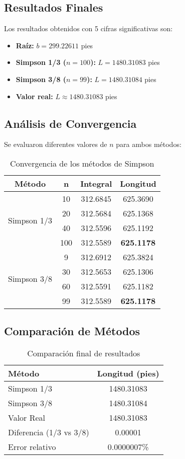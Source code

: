 \documentclass[conference]{IEEEtran}
\begin{document}
\subsection{Resultados Finales}

Los resultados obtenidos con 5 cifras significativas son:

\begin{itemize}
    \item \textbf{Raíz:} $b = 299.22611$ pies
    \item \textbf{Simpson 1/3 ($n=100$):} $L = 1480.31083$ pies
    \item \textbf{Simpson 3/8 ($n=99$):} $L = 1480.31084$ pies
    \item \textbf{Valor real:} $L \approx 1480.31083$ pies
\end{itemize}

\subsection{Análisis de Convergencia}

Se evaluaron diferentes valores de $n$ para ambos métodos:

\begin{table}[H]
\centering
\caption{Convergencia de los métodos de Simpson}
\small
\begin{tabular}{|c|c|c|c|}
\hline
\textbf{Método} & \textbf{n} & \textbf{Integral} & \textbf{Longitud} \\
\hline
\multirow{4}{*}{Simpson 1/3} 
& 10 & 312.6845 & 625.3690 \\
& 20 & 312.5684 & 625.1368 \\
& 40 & 312.5596 & 625.1192 \\
& 100 & 312.5589 & \textbf{625.1178} \\
\hline
\multirow{4}{*}{Simpson 3/8} 
& 9 & 312.6912 & 625.3824 \\
& 30 & 312.5653 & 625.1306 \\
& 60 & 312.5591 & 625.1182 \\
& 99 & 312.5589 & \textbf{625.1178} \\
\hline
\end{tabular}
\end{table}

\subsection{Comparación de Métodos}

\begin{table}[H]
\centering
\caption{Comparación final de resultados}
\begin{tabular}{|l|c|}
\hline
\textbf{Método} & \textbf{Longitud (pies)} \\
\hline
Simpson 1/3 & 1480.31083 \\
Simpson 3/8 & 1480.31084 \\
Valor Real & 1480.31083 \\
\hline
Diferencia (1/3 vs 3/8) & 0.00001 \\
Error relativo & 0.0000007\% \\
\hline
\end{tabular}
\end{table}
\end{document}
